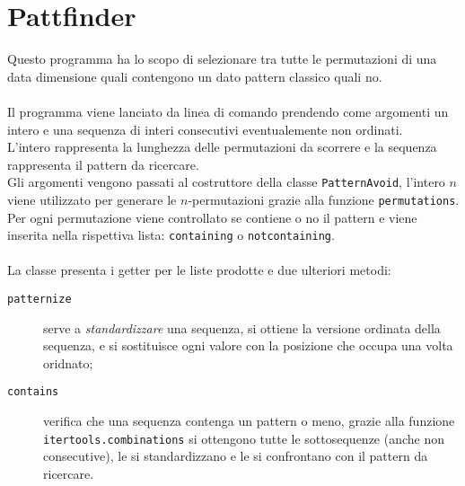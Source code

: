 \section*{Pattfinder}
Questo programma ha lo scopo di selezionare tra tutte le permutazioni di una data dimensione quali contengono un dato pattern classico quali no.\\\\
Il programma viene lanciato da linea di comando prendendo come argomenti un intero e una sequenza di interi consecutivi eventualemente non ordinati.\\
L'intero rappresenta la lunghezza delle permutazioni da scorrere e la sequenza rappresenta il pattern da ricercare.\\
Gli argomenti vengono passati al costruttore della classe \texttt{PatternAvoid}, l'intero $n$ viene utilizzato per generare le $n$-permutazioni grazie alla funzione \texttt{permutations}. Per ogni permutazione viene controllato se contiene o no il pattern e viene inserita nella rispettiva lista: \texttt{containing} o \texttt{notcontaining}.\\\\
La classe presenta i getter per le liste prodotte e due ulteriori metodi: 
\begin{description}
\item[\texttt{patternize}] serve a \textit{standardizzare} una sequenza, si ottiene la versione ordinata della sequenza, e si sostituisce ogni valore con la posizione che occupa una volta oridnato;  
\item[\texttt{contains}] verifica che una sequenza contenga un pattern o meno, grazie alla funzione \texttt{itertools.combinations} si ottengono tutte le sottosequenze (anche non consecutive), le si standardizzano e le si confrontano con il pattern da ricercare.
\end{description}
